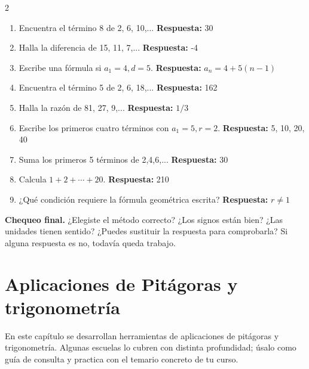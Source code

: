 \documentclass[10pt,oneside,openany]{book}
\begin{document}
\begin{multicols}{2}\begin{enumerate}

\item Encuentra el término 8 de 2, 6, 10,... \textbf{Respuesta:} 30

\item Halla la diferencia de 15, 11, 7,... \textbf{Respuesta:} -4

\item Escribe una fórmula si $a_1=4,d=5$. \textbf{Respuesta:} $a_n=4+5(n-1)$

\item Encuentra el término 5 de 2, 6, 18,... \textbf{Respuesta:} 162

\item Halla la razón de 81, 27, 9,... \textbf{Respuesta:} $1/3$

\item Escribe los primeros cuatro términos con $a_1=5,r=2$. \textbf{Respuesta:} 5, 10, 20, 40

\item Suma los primeros 5 términos de 2,4,6,... \textbf{Respuesta:} 30

\item Calcula $1+2+\cdots+20$. \textbf{Respuesta:} 210

\item ¿Qué condición requiere la fórmula geométrica escrita? \textbf{Respuesta:} $r\neq1$

\end{enumerate}\end{multicols}

\begin{idea}\textbf{Chequeo final.} ¿Elegiste el método correcto? ¿Los signos están bien? ¿Las unidades tienen sentido? ¿Puedes sustituir la respuesta para comprobarla? Si alguna respuesta es no, todavía queda trabajo.\end{idea}



\chapter{Aplicaciones de Pitágoras y trigonometría}

\begin{idea}
En este capítulo se desarrollan herramientas de aplicaciones de pitágoras y trigonometría. Algunas escuelas lo cubren con distinta profundidad; úsalo como guía de consulta y practica con el temario concreto de tu curso.
\end{idea}
\end{document}
